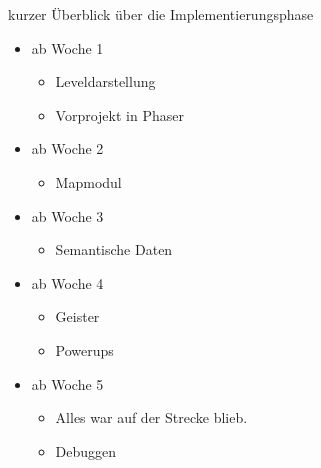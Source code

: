 \documentclass{beamer}
\begin{document}
\begin{frame}{kurzer Überblick über die Implementierungsphase}
\begin{itemize}
\item ab Woche 1
\begin{itemize}
\item Leveldarstellung
\item Vorprojekt in Phaser
\end{itemize}
\item ab Woche 2
\begin{itemize}
\item Mapmodul
\end{itemize}
\item ab Woche 3
\begin{itemize}
\item Semantische Daten
\end{itemize}
\item ab Woche 4
\begin{itemize}
\item Geister
\item Powerups
\end{itemize}
\item ab Woche 5
\begin{itemize}
\item Alles war auf der Strecke blieb.
\item Debuggen
\end{itemize}
\end{itemize}
\end{frame}
\end{document}
